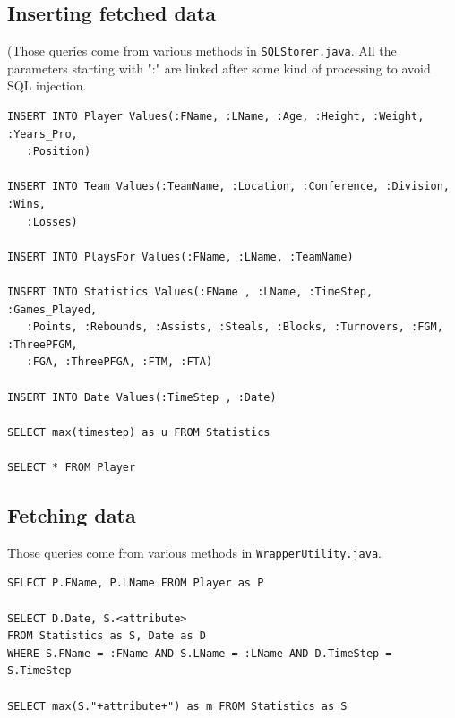 \documentclass[paper=A4, fontsize=11pt]{scrartcl} %
\begin{document}
\subsection{Inserting fetched data}
(Those queries come from various methods in \verb!SQLStorer.java!. All the parameters starting with ":" are linked after some kind of processing to avoid SQL injection.

\begin{verbatim}
INSERT INTO Player Values(:FName, :LName, :Age, :Height, :Weight, :Years_Pro,
   :Position)
                
INSERT INTO Team Values(:TeamName, :Location, :Conference, :Division, :Wins,
   :Losses)
                            
INSERT INTO PlaysFor Values(:FName, :LName, :TeamName)
                                        
INSERT INTO Statistics Values(:FName , :LName, :TimeStep, :Games_Played,
   :Points, :Rebounds, :Assists, :Steals, :Blocks, :Turnovers, :FGM, :ThreePFGM,
   :FGA, :ThreePFGA, :FTM, :FTA)
                    
INSERT INTO Date Values(:TimeStep , :Date)
                            
SELECT max(timestep) as u FROM Statistics
                                    
SELECT * FROM Player
\end{verbatim}

\subsection{Fetching data}
Those queries come from various methods in \verb!WrapperUtility.java!.

\begin{verbatim}
SELECT P.FName, P.LName FROM Player as P
        
SELECT D.Date, S.<attribute> 
FROM Statistics as S, Date as D 
WHERE S.FName = :FName AND S.LName = :LName AND D.TimeStep = S.TimeStep
        
SELECT max(S."+attribute+") as m FROM Statistics as S                
\end{verbatim}
\end{document}
